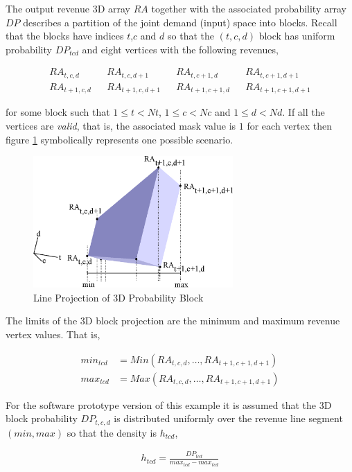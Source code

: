 The output revenue 3D array $RA$ together with the associated probability array $DP$ describes a partition of the joint demand (input) space into blocks. Recall that the blocks have indices $t$,$c$ and $d$ so that the $(t,c,d)$ block has uniform probability $DP_{tcd}$ and eight vertices with the following revenues,

\begin{align*}
RA_{t,c,d} && RA_{t,c,d+1} && RA_{t,c+1,d} && RA_{t,c+1,d+1}\\
RA_{t+1,c,d} && RA_{t+1,c,d+1} && RA_{t+1,c+1,d} && RA_{t+1,c+1,d+1}
\end{align*}

for some block such that $1 \le t < Nt$, $1 \le c < Nc$ and $1 \le d < Nd$. If all the vertices are \emph{valid}, that is, the associated mask value is $1$ for each vertex then figure \ref{fig:block_projection} symbolically represents one possible scenario.

\begin{figure}
  \centering
  \includegraphics[width=3in]{Images/block_projection}
  \caption[Line Projection of 3D Probability Block]
          {Line Projection of 3D Probability Block}
  \label{fig:block_projection}
\end{figure}

The limits of the 3D block projection are the minimum and maximum revenue vertex values. That is,

\begin{align*}
min_{tcd} &= Min(RA_{t,c,d}, \dots, RA_{t+1,c+1,d+1})\\
max_{tcd} &= Max(RA_{t,c,d}, \dots, RA_{t+1,c+1,d+1})
\end{align*}

For the software prototype version of this example it is assumed that the 3D block probability $DP_{t,c,d}$ is distributed uniformly over the revenue line segment $(min, max)$ so that the density is $h_{tcd}$,

\begin{align*}
h_{tcd} = \frac{DP_{tcd}}{max_{tcd} - max_{tcd}}
\end{align*}

